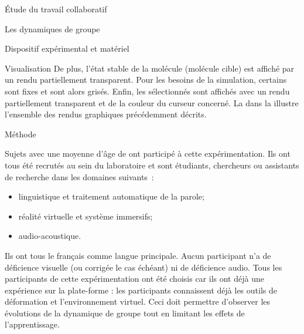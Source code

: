 \documentclass[myfrancais]{mythesis}
\begin{document}
\begin{mypart}{Étude du travail collaboratif}
\begin{mychapter}{Les dynamiques de groupe}
\begin{mysection}{Dispositif expérimental et matériel}
\begin{mysubsection}{Visualisation}
					De plus, l'état stable de la molécule (molécule cible) est affiché par un rendu \myNewRibbon partiellement transparent.
					Pour les besoins de la simulation, certains  sont fixes et sont alors grisés.
					Enfin, les  sélectionnés sont affichés avec un rendu \myCPK partiellement transparent et de la couleur du curseur concerné.
					La  dans la  illustre l'ensemble des rendus graphiques précédemment décrits.
				\end{mysubsection}
			\end{mysection}
			\begin{mysection}{Méthode}
				\begin{mysubsection}[sse-exp3-Sujets]{Sujets}
					 avec une moyenne d'âge de  ont participé à cette expérimentation.
					Ils ont tous été recrutés au sein du laboratoire  et sont étudiants, chercheurs ou assistants de recherche dans les domaines suivants~:
					\begin{itemize}
						\item linguistique et traitement automatique de la parole;
						\item réalité virtuelle et système immersifs;
						\item audio-acoustique.
					\end{itemize}
					Ils ont tous le français comme langue principale.
					Aucun participant n'a de déficience visuelle (ou corrigée le cas échéant) ni de déficience audio.
					Tous les participants de cette expérimentation ont été choisis car ils ont déjà une expérience sur la plate-forme : les participants connaissent déjà les outils de déformation et l'environnement virtuel.
					Ceci doit permettre d'observer les évolutions de la dynamique de groupe tout en limitant les effets de l'apprentissage.


\end{mysubsection}
\end{mysection}
\end{mychapter}
\end{mypart}
\end{document}
